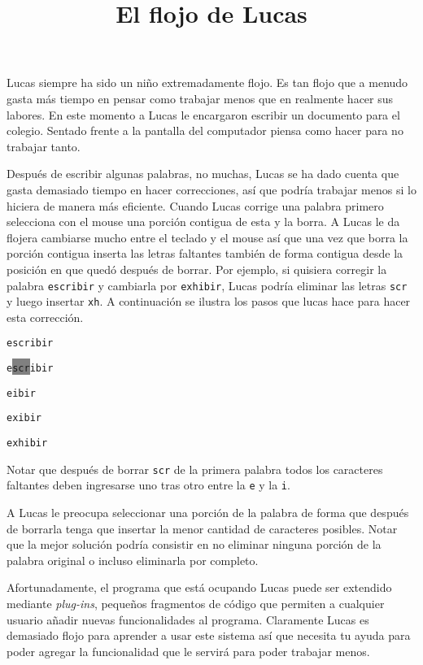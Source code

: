 \documentclass{oci}
\title{El flojo de Lucas}
\begin{document}
\begin{problemDescription}
  Lucas siempre ha sido un niño extremadamente flojo.
  Es tan flojo que a menudo gasta más tiempo en pensar como trabajar menos que
  en realmente hacer sus labores.
  En este momento a Lucas le encargaron escribir un documento para el colegio.
  Sentado frente a la pantalla del computador piensa como hacer para no trabajar
  tanto.

  Después de escribir algunas palabras, no muchas, Lucas se ha dado cuenta que
  gasta demasiado tiempo en hacer correcciones, así que podría trabajar menos si
  lo hiciera de manera más eficiente.
  Cuando Lucas corrige una palabra primero selecciona con el mouse una porción
  contigua de esta y la borra.
  A Lucas le da flojera cambiarse mucho entre el teclado y el mouse así que una
  vez que borra la porción contigua inserta las letras faltantes también de
  forma contigua desde la posición en que quedó después de borrar.
  Por ejemplo, si quisiera corregir la palabra \texttt{escribir} y cambiarla por
  \texttt{exhibir}, Lucas podría eliminar las letras \texttt{scr} y luego
  insertar \texttt{xh}.
  A continuación se ilustra los pasos que lucas hace para hacer esta corrección.

  \newcommand{\caret}{{\color{gray}\hspace{-0.2em}\raisebox{-0.1em}{\scalebox{1.1}{|}}\hspace{-0.24em}}}
  \begin{center}
    \texttt{escribir}

    \texttt{e\colorbox{gray}{\hspace{-0.24em}scr\hspace{-0.24em}}ibir}

    \texttt{e\caret{}ibir}

    \texttt{ex\caret{}ibir}

    \texttt{exh\caret{}ibir}
  \end{center}

  Notar que después de borrar \texttt{scr} de la primera palabra
  todos los caracteres faltantes deben ingresarse uno tras otro entre la
  \texttt{e} y la \texttt{i}.

  A Lucas le preocupa seleccionar una porción de la palabra de forma que después
  de borrarla tenga que insertar la menor cantidad de caracteres posibles.
  Notar que la mejor solución podría consistir en no eliminar ninguna porción de
  la palabra original o incluso eliminarla por completo.

  Afortunadamente, el programa que está ocupando Lucas puede ser extendido
  mediante \emph{plug-ins}, pequeños fragmentos de código que permiten a 
  cualquier usuario añadir nuevas funcionalidades al programa.
  Claramente Lucas es demasiado flojo para aprender a usar este sistema así que
  necesita tu ayuda para poder agregar la funcionalidad que le servirá para
  poder trabajar menos.


\end{problemDescription}
\end{document}

